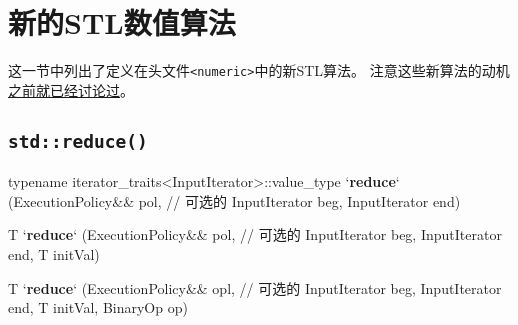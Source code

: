 \section{新的STL数值算法}
这一节中列出了定义在头文件\texttt{<numeric>}中的新STL算法。
注意这些新算法的动机\hyperref[ch22.6]{之前就已经讨论过}。

\subsection{\texttt{std::reduce()}}\label{ch23.2.1}
\begin{algolisting}
typename iterator_traits<InputIterator>::value_type
`\textbf{reduce}` (ExecutionPolicy&& pol,   // 可选的
        InputIterator beg, InputIterator end)

T
`\textbf{reduce}` (ExecutionPolicy&& pol,   // 可选的
        InputIterator beg, InputIterator end,
        T initVal)

T
`\textbf{reduce}` (ExecutionPolicy&& opl,   // 可选的
        InputIterator beg, InputIterator end,
        T initVal,
        BinaryOp op)
\end{algolisting}
